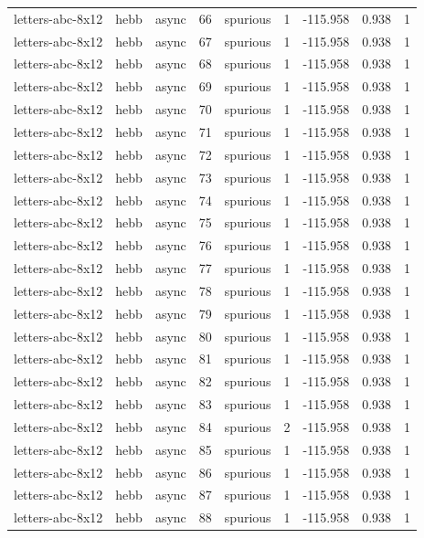 \begin{tabular}{lllrlrrrr}
letters-abc-8x12 & hebb & async & 66 & spurious & 1 & -115.958 & 0.938 & 1 \\
letters-abc-8x12 & hebb & async & 67 & spurious & 1 & -115.958 & 0.938 & 1 \\
letters-abc-8x12 & hebb & async & 68 & spurious & 1 & -115.958 & 0.938 & 1 \\
letters-abc-8x12 & hebb & async & 69 & spurious & 1 & -115.958 & 0.938 & 1 \\
letters-abc-8x12 & hebb & async & 70 & spurious & 1 & -115.958 & 0.938 & 1 \\
letters-abc-8x12 & hebb & async & 71 & spurious & 1 & -115.958 & 0.938 & 1 \\
letters-abc-8x12 & hebb & async & 72 & spurious & 1 & -115.958 & 0.938 & 1 \\
letters-abc-8x12 & hebb & async & 73 & spurious & 1 & -115.958 & 0.938 & 1 \\
letters-abc-8x12 & hebb & async & 74 & spurious & 1 & -115.958 & 0.938 & 1 \\
letters-abc-8x12 & hebb & async & 75 & spurious & 1 & -115.958 & 0.938 & 1 \\
letters-abc-8x12 & hebb & async & 76 & spurious & 1 & -115.958 & 0.938 & 1 \\
letters-abc-8x12 & hebb & async & 77 & spurious & 1 & -115.958 & 0.938 & 1 \\
letters-abc-8x12 & hebb & async & 78 & spurious & 1 & -115.958 & 0.938 & 1 \\
letters-abc-8x12 & hebb & async & 79 & spurious & 1 & -115.958 & 0.938 & 1 \\
letters-abc-8x12 & hebb & async & 80 & spurious & 1 & -115.958 & 0.938 & 1 \\
letters-abc-8x12 & hebb & async & 81 & spurious & 1 & -115.958 & 0.938 & 1 \\
letters-abc-8x12 & hebb & async & 82 & spurious & 1 & -115.958 & 0.938 & 1 \\
letters-abc-8x12 & hebb & async & 83 & spurious & 1 & -115.958 & 0.938 & 1 \\
letters-abc-8x12 & hebb & async & 84 & spurious & 2 & -115.958 & 0.938 & 1 \\
letters-abc-8x12 & hebb & async & 85 & spurious & 1 & -115.958 & 0.938 & 1 \\
letters-abc-8x12 & hebb & async & 86 & spurious & 1 & -115.958 & 0.938 & 1 \\
letters-abc-8x12 & hebb & async & 87 & spurious & 1 & -115.958 & 0.938 & 1 \\
letters-abc-8x12 & hebb & async & 88 & spurious & 1 & -115.958 & 0.938 & 1 \\

\end{tabular}
